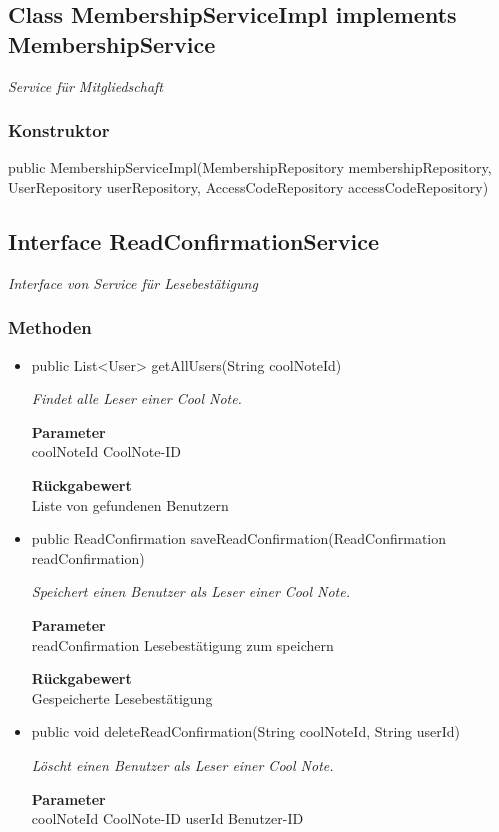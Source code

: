 \documentclass[a4paper]{scrreprt}
\begin{document}
    \subsection{Class MembershipServiceImpl implements MembershipService}
    \textit{Service für Mitgliedschaft}
    \subsubsection{Konstruktor}
    public MembershipServiceImpl(MembershipRepository membershipRepository, UserRepository userRepository, AccessCodeRepository accessCodeRepository)
    \subsection{Interface ReadConfirmationService}
    \textit{Interface von Service für Lesebestätigung}
    \subsubsection{Methoden}
    \begin{itemize}
    	\item{public List<User> getAllUsers(String coolNoteId)}
    	
    	\textit{Findet alle Leser einer Cool Note.}
    	
    	\textbf{Parameter} \\
    	coolNoteId CoolNote-ID
    	
    	\textbf{Rückgabewert} \\
    	Liste von gefundenen Benutzern        \item{public ReadConfirmation saveReadConfirmation(ReadConfirmation readConfirmation)}
    	
    	\textit{Speichert einen Benutzer als Leser einer Cool Note.}
    	
    	\textbf{Parameter} \\
    	readConfirmation Lesebestätigung zum speichern
    	
    	\textbf{Rückgabewert} \\
    	Gespeicherte Lesebestätigung        \item{public void deleteReadConfirmation(String coolNoteId, String userId)}
    	
    	\textit{Löscht einen Benutzer als Leser einer Cool Note.}
    	
    	\textbf{Parameter} \\
    	coolNoteId CoolNote-ID
    	userId Benutzer-ID
    	
    	
    \end{itemize}
\end{document}
